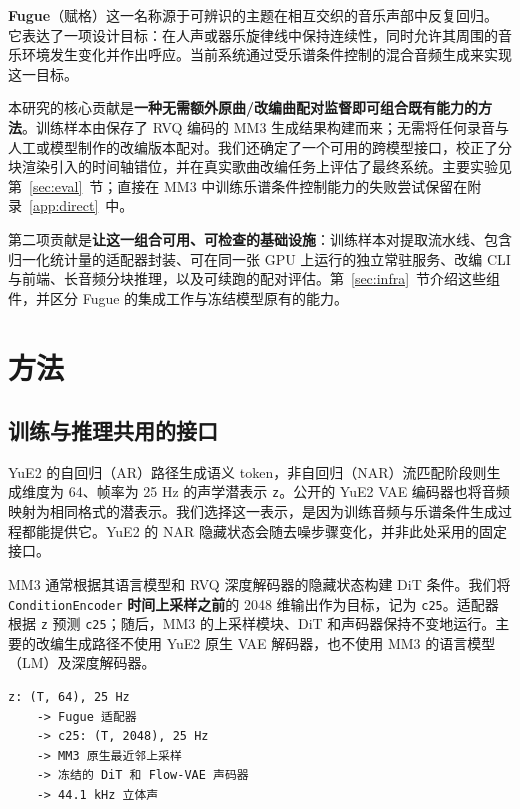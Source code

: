\documentclass[11pt,a4paper,fontset=fandol]{ctexart}
\newcommand{\code}[1]{\texttt{#1}}
\begin{document}
\textbf{Fugue}（赋格）这一名称源于可辨识的主题在相互交织的音乐声部中反复回归。它表达了一项设计目标：在人声或器乐旋律线中保持连续性，同时允许其周围的音乐环境发生变化并作出呼应。当前系统通过受乐谱条件控制的混合音频生成来实现这一目标。

本研究的核心贡献是\textbf{一种无需额外原曲/改编曲配对监督即可组合既有能力的方法}。训练样本由保存了 RVQ 编码的 MM3 生成结果构建而来；无需将任何录音与人工或模型制作的改编版本配对。我们还确定了一个可用的跨模型接口，校正了分块渲染引入的时间轴错位，并在真实歌曲改编任务上评估了最终系统。主要实验见第~\ref{sec:eval}~节；直接在 MM3 中训练乐谱条件控制能力的失败尝试保留在附录~\ref{app:direct}~中。

第二项贡献是\textbf{让这一组合可用、可检查的基础设施}：训练样本对提取流水线、包含归一化统计量的适配器封装、可在同一张 GPU 上运行的独立常驻服务、改编 CLI 与前端、长音频分块推理，以及可续跑的配对评估。第~\ref{sec:infra}~节介绍这些组件，并区分 Fugue 的集成工作与冻结模型原有的能力。

\section{方法}

\subsection{训练与推理共用的接口}

YuE2 的自回归（AR）路径生成语义 token，非自回归（NAR）流匹配阶段则生成维度为 64、帧率为 25 Hz 的声学潜表示 \code{z}。公开的 YuE2 VAE 编码器也将音频映射为相同格式的潜表示。我们选择这一表示，是因为训练音频与乐谱条件生成过程都能提供它。YuE2 的 NAR 隐藏状态会随去噪步骤变化，并非此处采用的固定接口。

MM3 通常根据其语言模型和 RVQ 深度解码器的隐藏状态构建 DiT 条件。我们将 \code{ConditionEncoder} \textbf{时间上采样之前}的 2048 维输出作为目标，记为 \code{c25}。适配器根据 \code{z} 预测 \code{c25}；随后，MM3 的上采样模块、DiT 和声码器保持不变地运行。主要的改编生成路径不使用 YuE2 原生 VAE 解码器，也不使用 MM3 的语言模型（LM）及深度解码器。

\begin{Verbatim}[frame=single,fontsize=\small,samepage=true,xleftmargin=1em,xrightmargin=1em]
z: (T, 64), 25 Hz
    -> Fugue 适配器
    -> c25: (T, 2048), 25 Hz
    -> MM3 原生最近邻上采样
    -> 冻结的 DiT 和 Flow-VAE 声码器
    -> 44.1 kHz 立体声
\end{Verbatim}
\end{document}

